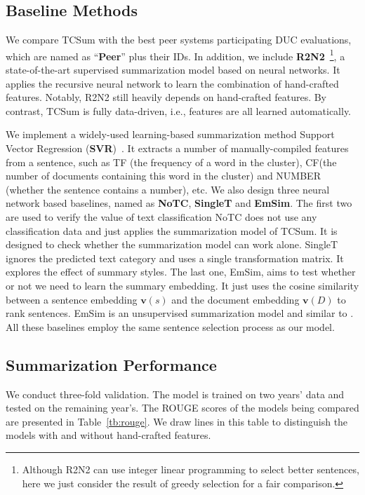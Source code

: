 \documentclass[letterpaper]{article}
\begin{document}
\subsection{Baseline Methods} \label{SC:baseline}
We compare TCSum with the best peer systems participating DUC evaluations, which are named as ``\textbf{Peer}'' plus their IDs.
In addition, we include \textbf{R2N2}~\cite{cao2015ranking}\footnote{Although R2N2 can use integer linear programming to select better sentences, here we just consider the result of greedy selection for a fair comparison.}, a state-of-the-art supervised summarization model based on neural networks.
It applies the recursive neural network to learn the combination of hand-crafted features.
Notably, R2N2 still heavily depends on hand-crafted features.
By contrast, TCSum is fully data-driven, i.e., features are all learned automatically. 

We implement a widely-used learning-based summarization method Support Vector Regression  (\textbf{SVR})~\cite{li2007multi}.
It extracts a number of manually-compiled features from a sentence, such as TF (the frequency of a word in the cluster), CF(the number of documents containing this word in the cluster) and NUMBER (whether the sentence contains a number), etc. 
We also design three neural network based baselines, named as \textbf{NoTC}, \textbf{SingleT} and \textbf{EmSim}.
The first two are used to verify the value of text classification
NoTC does not use any classification data and just applies the summarization model of TCSum.
It is designed to check whether the summarization model can work alone.
SingleT ignores the predicted text category and uses a single transformation matrix.    
It explores the effect of summary styles.
The last one, EmSim, aims to test whether or not we need to learn the summary embedding. 
It just uses the cosine similarity between a sentence embedding ${\mathbf{v}}(s)$ and the document embedding ${\mathbf{v}}(D)$ to rank sentences.
EmSim is an unsupervised summarization model and similar to \cite{kobayashi-noguchi-yatsuka:2015:EMNLP}.
All these baselines employ the same sentence selection process as our model.
 
\subsection{Summarization Performance}
We conduct three-fold validation. 
The model is trained on two years' data and tested on the remaining year's.
The ROUGE scores of the models being compared are presented in Table~\ref{tb:rouge}.
We draw lines in this table to distinguish the models with and without hand-crafted features.
\end{document}
